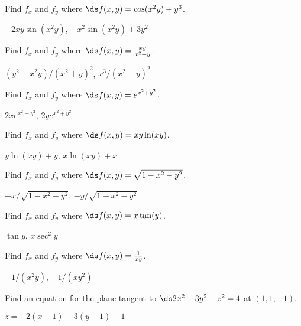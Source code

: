 \begin{exercises}

\begin{exercise} Find $f_x$ and $f_y$ where $\ds f(x,y)=\cos(x^2y)+y^3$.
\begin{answer} $-2xy\sin(x^2y)$, $-x^2\sin(x^2y)+3y^2$
\end{answer}\end{exercise}

\begin{exercise} Find $f_x$ and $f_y$ where $\ds f(x,y)={xy\over x^2+y}$.
\begin{answer} $(y^2-x^2y)/(x^2+y)^2$, $x^3/(x^2+y)^2$
\end{answer}\end{exercise}

\begin{exercise} Find $f_x$ and $f_y$ where $\ds f(x,y)=e^{x^2+y^2}$.
\begin{answer} $2xe^{x^2+y^2}$, $2ye^{x^2+y^2}$
\end{answer}\end{exercise}

\begin{exercise} Find $f_x$ and $f_y$ where $\ds f(x,y)=xy\ln(xy)$.
\begin{answer} $y\ln(xy)+y$, $x\ln(xy)+x$
\end{answer}\end{exercise}

\begin{exercise} Find $f_x$ and $f_y$ where $\ds f(x,y)=\sqrt{1-x^2-y^2}$.
\begin{answer} $-x/\sqrt{1-x^2-y^2}$, $-y/\sqrt{1-x^2-y^2}$
\end{answer}\end{exercise}

\begin{exercise} Find $f_x$ and $f_y$ where $\ds f(x,y)=x\tan(y)$.
\begin{answer} $\tan y$, $x\sec^2 y$
\end{answer}\end{exercise}

\begin{exercise} Find $f_x$ and $f_y$ where $\ds f(x,y)={1\over xy}$.
\begin{answer} $-1/(x^2y)$, $-1/(xy^2)$
\end{answer}\end{exercise}

\begin{exercise} Find an equation for the plane tangent to 
$\ds 2x^2+3y^2-z^2=4$ at
$(1,1,-1)$. 
\begin{answer} $z=-2(x-1)-3(y-1)-1$
\end{answer}\end{exercise}


\end{exercises}

